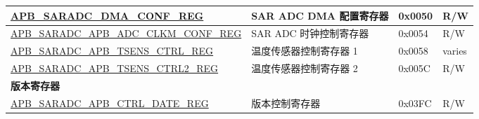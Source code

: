 \begin{longtable}{ | p{7cm} | p{5.2cm} | p{1.3cm} | p{1cm} | }
\hyperref[regdesc:APBSARADCDMACONFREG]{APB\_SARADC\_DMA\_CONF\_REG} & SAR ADC DMA 配置寄存器& 0x0050 & R/W \\ \hline
\hyperref[regdesc:APBSARADCCLKMCONFREG]{APB\_SARADC\_APB\_ADC\_CLKM\_CONF\_REG} & SAR ADC 时钟控制寄存器 & 0x0054 & R/W \\ \hline
\hyperref[regdesc:APBSARADCAPBTSENSCTRLREG]{APB\_SARADC\_APB\_TSENS\_CTRL\_REG} & 温度传感器控制寄存器 1 & 0x0058 & varies \\ \hline
\hyperref[regdesc:APBSARADCTSENSCTRL2REG]{APB\_SARADC\_APB\_TSENS\_CTRL2\_REG} & 温度传感器控制寄存器 2 & 0x005C & R/W \\ \hline
\multicolumn{4}{|l|}{\textbf{版本寄存器}} \\ \hline
\hyperref[regdesc:APBSARADCCTRLDATEREG]{APB\_SARADC\_APB\_CTRL\_DATE\_REG} & 版本控制寄存器 & 0x03FC & R/W \\ \hline
\end{longtable}

